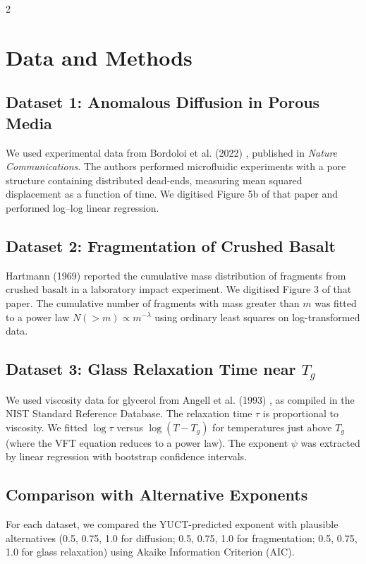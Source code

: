 \documentclass[11pt,a4paper]{article}
\begin{document}
\begin{multicols}{2}
		\section{Data and Methods}
		
		\subsection{Dataset 1: Anomalous Diffusion in Porous Media}
		We used experimental data from Bordoloi et al. (2022) \cite{Bordoloi2022}, published in \emph{Nature Communications}. The authors performed microfluidic experiments with a pore structure containing distributed dead-ends, measuring mean squared displacement as a function of time. We digitised Figure 5b of that paper and performed log–log linear regression.
		
		\subsection{Dataset 2: Fragmentation of Crushed Basalt}
		Hartmann (1969) \cite{Hartmann1969} reported the cumulative mass distribution of fragments from crushed basalt in a laboratory impact experiment. We digitised Figure 3 of that paper. The cumulative number of fragments with mass greater than \(m\) was fitted to a power law \(N(>m) \propto m^{-\lambda}\) using ordinary least squares on log-transformed data.
		
		\subsection{Dataset 3: Glass Relaxation Time near \(T_g\)}
		We used viscosity data for glycerol from Angell et al. (1993) \cite{Angell1993}, as compiled in the NIST Standard Reference Database. The relaxation time \(\tau\) is proportional to viscosity. We fitted \(\log \tau\) versus \(\log(T - T_g)\) for temperatures just above \(T_g\) (where the VFT equation reduces to a power law). The exponent \(\psi\) was extracted by linear regression with bootstrap confidence intervals.
		
		\subsection{Comparison with Alternative Exponents}
		For each dataset, we compared the YUCT-predicted exponent with plausible alternatives (0.5, 0.75, 1.0 for diffusion; 0.5, 0.75, 1.0 for fragmentation; 0.5, 0.75, 1.0 for glass relaxation) using Akaike Information Criterion (AIC).
		

\end{multicols}
\end{document}
